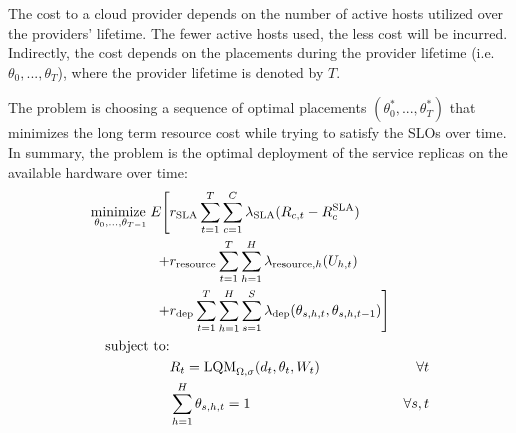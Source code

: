   The cost to a cloud provider depends on the number of active hosts utilized over the providers' lifetime. The fewer active hosts used, the less cost will be incurred. 
  Indirectly, the cost depends on the placements during the provider lifetime (i.e. $\theta_{0},...,\theta_T$), where the provider lifetime is denoted by $T$.  

 The problem is choosing a sequence of optimal placements $(\theta^*_0,...,\theta^*_T)$ that minimizes the long term resource cost while trying to satisfy the SLOs over time. In summary, the problem is the optimal deployment of the service replicas on the available hardware over time: 
\begin{equation}
  \begin{aligned}
\underset{\theta_0,...,\theta_{T-1}} {\text{minimize } } 
   E \Bigg[ 
		 &r_{\text{SLA}} \sum^{T}_{t=1} \sum^C_{c=1}   \lambda_\text{SLA}(R_{c,t} - R_c^\text{SLA})   \\
   + & r_{\text{resource}} \sum^{T}_{t=1} \sum_{h=1}^H \lambda_{\text{resource},h}(U_{h,t})  \\
   + & r_{\text{dep}}  \sum^{T}_{t=1} \sum^H_{h=1}  \sum^S_{s=1} \lambda_\text{dep}(\theta_{s,h,t},\theta_{s,h,t-1}) \Bigg]  \\ 
\text{subject to:} \nonumber \\ 
 & R_{t} =  \text{LQM}_{\Omega,\sigma}(d_{t},\theta_{t}, W_{t})  &  \forall t  \\ 
 &  \sum_{h=1}^H \theta_{s,h,t} = 1 &  \forall s , t
\label{eq:opt-overall-abstract}
    \end{aligned}
\end{equation}

